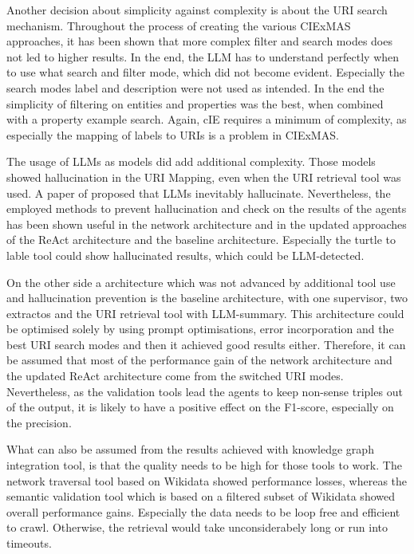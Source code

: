 \documentclass[a4paper,oneside,bibliography=totoc]{scrbook}
\begin{document}
Another decision about simplicity against complexity is about the URI search mechanism. Throughout the process of creating the various CIExMAS approaches, it has been shown that more complex filter and search modes does not led to higher results. In the end, the \ac{LLM} has to understand perfectly when to use what search and filter mode, which did not become evident. Especially the search modes label and description were not used as intended. In the end the simplicity of filtering on entities and properties was the best, when combined with a property example search. Again, \ac{cIE} requires a minimum of complexity, as especially the mapping of labels to URIs is a problem in CIExMAS.

The usage of LLMs as models did add additional complexity. Those models showed hallucination in the URI Mapping, even when the URI retrieval tool was used. A paper of \citet{Xu2025} proposed that \acp{LLM} inevitably hallucinate. Nevertheless, the employed methods to prevent hallucination and check on the results of the agents has been shown useful in the network architecture and in the updated approaches of the ReAct architecture and the baseline architecture. Especially the turtle to lable tool could show hallucinated results, which could be \ac{LLM}-detected.

On the other side a architecture which was not advanced by additional tool use and hallucination prevention is the baseline architecture, with one supervisor, two extractos and the URI retrieval tool with \ac{LLM}-summary. This architecture could be optimised solely by using prompt optimisations, error incorporation and the best URI search modes and then it achieved good results either. Therefore, it can be assumed that most of the performance gain of the network architecture and the updated ReAct architecture come from the switched URI modes. Nevertheless, as the validation tools lead the agents to keep non-sense triples out of the output, it is likely to have a positive effect on the F1-score, especially on the precision.

What can also be assumed from the results achieved with knowledge graph integration tool, is that the quality needs to be high for those tools to work. The network traversal tool based on Wikidata showed performance losses, whereas the semantic validation tool which is based on a filtered subset of Wikidata showed overall performance gains. Especially the data needs to be loop free and efficient to crawl. Otherwise, the retrieval would take unconsiderabely long or run into timeouts.
\end{document}
